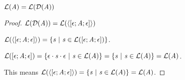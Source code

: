 \documentclass[numbers,10pt,preprint\ifanon ,nocopyrightspace\fi]{sigplanconf}
\begin{document}
\begin{lemma}
  \label{lem:atomtodnfeq}
  $\mathcal{L}(\mathit{A}) = \mathcal{L}(\mathcal{D}(\mathit{A}))$
\end{lemma}
\begin{proof}
  $\mathcal{L}(\mathcal{D}(\mathit{A})) =
  \mathcal{L}(\langle[\epsilon;\mathit{A};\epsilon]\rangle)$

  $\mathcal{L}(\langle[\epsilon;\mathit{A};\epsilon]\rangle) =
  \{\mathit{s} ~|~ \mathit{s} \in
    \mathcal{L}([\epsilon;\mathit{A};\epsilon])\}$.

  $\mathcal{L}([\epsilon;\mathit{A};\epsilon]) =
  \{\epsilon\cdot\mathit{s}\cdot\epsilon ~|~ \mathit{s} \in
    \mathcal{L}(\mathit{A})\} = \{\mathit{s} ~|~ \mathit{s} \in
    \mathcal{L}(\mathit{A})\} = \mathcal{L}(\mathit{A})$.

  This means $\mathcal{L}(\langle[\epsilon;\mathit{A};\epsilon]\rangle)
  = \{\mathit{s} ~|~ \mathit{s} \in \mathcal{L}(\mathit{A})\} =
  \mathcal{L}(\mathit{A})$.
\end{proof}
\end{document}
